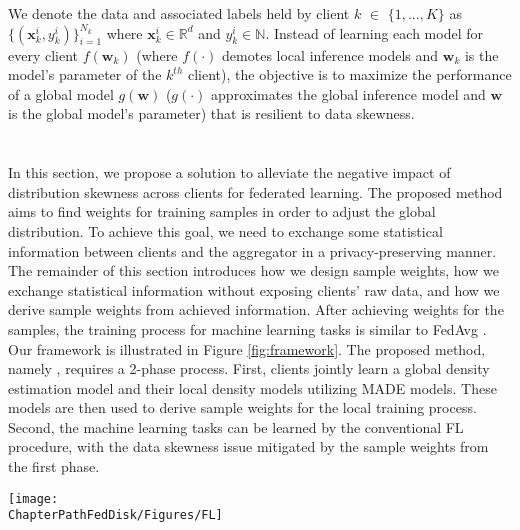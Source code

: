 We denote the data and associated labels held by client $k$ $\in$ $\{1,...,K\}$ as $ \{( \mathbf{x}_k^i,y_k^i )\}_{i=1}^{N_k}$ where $ \mathbf{x}_k^i \in \mathbb{R}^d$ and $y_k^i \in \mathbb{N}$. Instead of learning each model for every client $f(\mathbf{w}_k)$ (where $f(\cdot)$ demotes local inference models and $\mathbf{w}_k$ is the model's parameter of the $k^{th}$ client), the objective is to maximize the performance of a global model $g(\mathbf{w})$ ($g(\cdot)$ approximates the global inference model and $\mathbf{w}$ is the global model's parameter) that is resilient to data skewness.  

\section{\MethodnameLong{}}
\label{sec:FedMethodology}
\label{sec:methodology}
In this section, we propose a solution to alleviate the negative impact of distribution skewness across clients for federated learning. The proposed method aims to find weights for training samples in order to adjust the global distribution. To achieve this goal, we need to exchange some statistical information between clients and the aggregator in a privacy-preserving manner. The remainder of this section introduces how we design sample weights, how we exchange statistical information without exposing clients' raw data, and how we derive sample weights from achieved information. After achieving weights for the samples, the training process for machine learning tasks is similar to FedAvg \cite{OriginFL}. Our framework is illustrated in Figure \ref{fig:framework}. The proposed method, namely \MethodnameShort{}, requires a 2-phase process. First, clients jointly learn a global density estimation model and their local density models utilizing MADE models. These models are then used to derive sample weights for the local training process. Second, the machine learning tasks can be learned by the conventional FL procedure, with the data skewness issue mitigated by the sample weights from the first phase.
\begin{figure*}[ht!]
	\centering
	\texttt{[image: \\ChapterPathFedDisk/Figures/FL]}
	\caption[\MethodnameShort{} framework.]{\MethodnameShort{} framework. The proposed framework has two phases. First, local and global probability density functions ($p(x),q(x)$) are estimated via MADE models leveraging FL procedures. Then, the sample weights $\alpha$ are computed by approximating density ratio via class probability estimation. Second, the machine learning tasks (e.g., classification) can be performed similar to a typical FL method (i.e., FedAvg) with the sample weights acquired from phase 1.} 
	\label{fig:framework} 
	
\end{figure*}  

